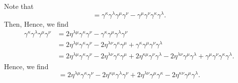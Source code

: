 \begin{solution}
    Note that
    \begin{equation}
        [\gamma^\kappa\gamma^\lambda,\gamma^\mu\gamma^\nu] = \gamma^\kappa\gamma^\lambda\gamma^\mu\gamma^\nu - \gamma^\mu\gamma^\nu\gamma^\kappa\gamma^\lambda.
    \end{equation}
    Then, 
    Hence, we find
    \begin{equation}
        \begin{aligned}
            \gamma^\kappa\gamma^\lambda\gamma^\mu\gamma^\nu &= 2\eta^{\lambda\mu}\gamma^\kappa\gamma^\nu -   \gamma^\kappa\gamma^\mu\gamma^\lambda\gamma^\nu \\
            &=2\eta^{\lambda\mu}\gamma^\kappa\gamma^\nu -2\eta^{\lambda\nu}\gamma^\kappa\gamma^\mu + \gamma^\kappa\gamma^\mu\gamma^\nu\gamma^\lambda\\
            &=2\eta^{\lambda\mu}\gamma^\kappa\gamma^\nu -2\eta^{\lambda\nu}\gamma^\kappa\gamma^\mu +2\eta^{\kappa\mu}\gamma^\nu\gamma^\lambda -2\eta^{\lambda\nu}\gamma^\mu\gamma^\lambda + \gamma^\mu\gamma^\nu\gamma^\kappa\gamma^\lambda.
            \end{aligned}
    \end{equation}
    Hence, we find
    \begin{equation}
        [\gamma^\kappa\gamma^\lambda, \gamma^\mu\gamma^\nu] = 2\eta^{\lambda\mu}\gamma^\kappa\gamma^\nu - 2\eta^{\kappa\mu}\gamma^\lambda\gamma^\nu + 2\eta^{\lambda\nu}\gamma^\mu\gamma^\kappa - 2\eta^{\kappa\nu}\gamma^\mu\gamma^\lambda.
    \end{equation}


\end{solution}

